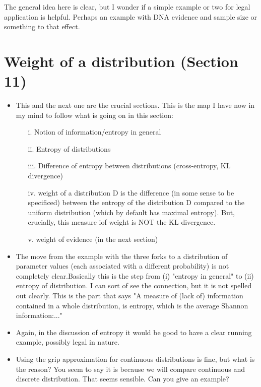 \documentclass[
  10pt,
  dvipsnames,enabledeprecatedfontcommands]{scrartcl}
\begin{document}
The general idea here is clear, but I wonder if a simple example or two
for legal application is helpful. Perhaps an example with DNA evidence
and sample size or something to that effect.

\hypertarget{weight-of-a-distribution-section-11}{%
\section{Weight of a distribution (Section
11)}\label{weight-of-a-distribution-section-11}}

\begin{itemize}

\item This and the next one are the crucial sections. This is the map I have now in my mind to 
follow what is going on in this section: 


\begin{enumerate}
\item[i.] Notion of information/entropy in general
\item[ii.] Entropy of distributions
\item[iii.] Difference of entropy between distributions (cross-entropy, KL divergence)
\item[iv.] weight of a distribution D is the difference (in some sense to be specificed) between the entropy of the distribution D compared to the uniform distribution (which by default has maximal entropy). But, crucially, this measure iof weight is NOT the KL divergence. 
\item[v.] weight of evidence (in the next section)
\end{enumerate}

\item The move from the example with the three forks to
a distribution of parameter values (each associated with a different probability) 
is not completely clear.Basically this is the step from (i) "entropy in general" to
(ii) entropy of distribution. I can sort of see the connection, 
but it is not spelled out clearly. This is the part that says "A measure of (lack of) information contained in a whole distribution, is entropy, which is the average Shannon information:..."

\item Again, in the discussion of entropy it would be 
good to have a clear running example, possibly 
legal in nature. 

\item Using the grip approximation for continuous distributions is fine, 
but what is the reason? You seem to say it is because we will compare continuous 
and discrete distribution. That seems sensible. Can you give an example?


\end{itemize}
\end{document}
